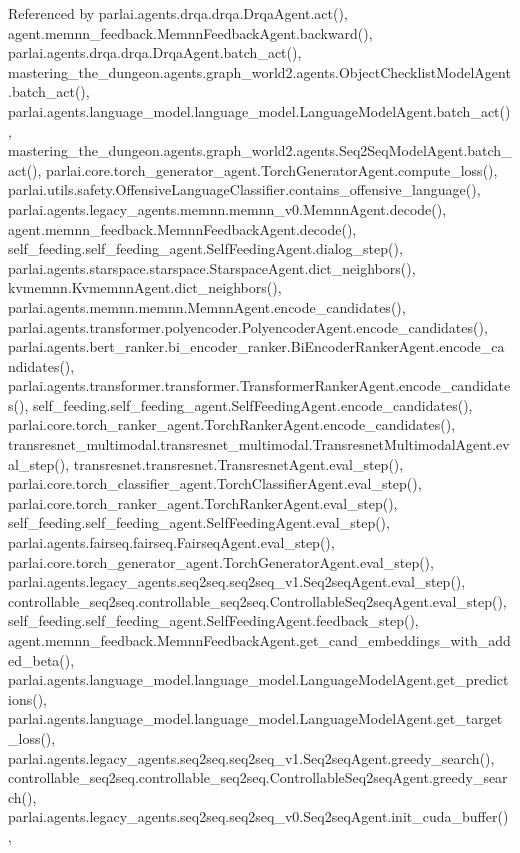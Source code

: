Referenced by parlai.\+agents.\+drqa.\+drqa.\+Drqa\+Agent.\+act(), agent.\+memnn\+\_\+feedback.\+Memnn\+Feedback\+Agent.\+backward(), parlai.\+agents.\+drqa.\+drqa.\+Drqa\+Agent.\+batch\+\_\+act(), mastering\+\_\+the\+\_\+dungeon.\+agents.\+graph\+\_\+world2.\+agents.\+Object\+Checklist\+Model\+Agent.\+batch\+\_\+act(), parlai.\+agents.\+language\+\_\+model.\+language\+\_\+model.\+Language\+Model\+Agent.\+batch\+\_\+act(), mastering\+\_\+the\+\_\+dungeon.\+agents.\+graph\+\_\+world2.\+agents.\+Seq2\+Seq\+Model\+Agent.\+batch\+\_\+act(), parlai.\+core.\+torch\+\_\+generator\+\_\+agent.\+Torch\+Generator\+Agent.\+compute\+\_\+loss(), parlai.\+utils.\+safety.\+Offensive\+Language\+Classifier.\+contains\+\_\+offensive\+\_\+language(), parlai.\+agents.\+legacy\+\_\+agents.\+memnn.\+memnn\+\_\+v0.\+Memnn\+Agent.\+decode(), agent.\+memnn\+\_\+feedback.\+Memnn\+Feedback\+Agent.\+decode(), self\+\_\+feeding.\+self\+\_\+feeding\+\_\+agent.\+Self\+Feeding\+Agent.\+dialog\+\_\+step(), parlai.\+agents.\+starspace.\+starspace.\+Starspace\+Agent.\+dict\+\_\+neighbors(), kvmemnn.\+Kvmemnn\+Agent.\+dict\+\_\+neighbors(), parlai.\+agents.\+memnn.\+memnn.\+Memnn\+Agent.\+encode\+\_\+candidates(), parlai.\+agents.\+transformer.\+polyencoder.\+Polyencoder\+Agent.\+encode\+\_\+candidates(), parlai.\+agents.\+bert\+\_\+ranker.\+bi\+\_\+encoder\+\_\+ranker.\+Bi\+Encoder\+Ranker\+Agent.\+encode\+\_\+candidates(), parlai.\+agents.\+transformer.\+transformer.\+Transformer\+Ranker\+Agent.\+encode\+\_\+candidates(), self\+\_\+feeding.\+self\+\_\+feeding\+\_\+agent.\+Self\+Feeding\+Agent.\+encode\+\_\+candidates(), parlai.\+core.\+torch\+\_\+ranker\+\_\+agent.\+Torch\+Ranker\+Agent.\+encode\+\_\+candidates(), transresnet\+\_\+multimodal.\+transresnet\+\_\+multimodal.\+Transresnet\+Multimodal\+Agent.\+eval\+\_\+step(), transresnet.\+transresnet.\+Transresnet\+Agent.\+eval\+\_\+step(), parlai.\+core.\+torch\+\_\+classifier\+\_\+agent.\+Torch\+Classifier\+Agent.\+eval\+\_\+step(), parlai.\+core.\+torch\+\_\+ranker\+\_\+agent.\+Torch\+Ranker\+Agent.\+eval\+\_\+step(), self\+\_\+feeding.\+self\+\_\+feeding\+\_\+agent.\+Self\+Feeding\+Agent.\+eval\+\_\+step(), parlai.\+agents.\+fairseq.\+fairseq.\+Fairseq\+Agent.\+eval\+\_\+step(), parlai.\+core.\+torch\+\_\+generator\+\_\+agent.\+Torch\+Generator\+Agent.\+eval\+\_\+step(), parlai.\+agents.\+legacy\+\_\+agents.\+seq2seq.\+seq2seq\+\_\+v1.\+Seq2seq\+Agent.\+eval\+\_\+step(), controllable\+\_\+seq2seq.\+controllable\+\_\+seq2seq.\+Controllable\+Seq2seq\+Agent.\+eval\+\_\+step(), self\+\_\+feeding.\+self\+\_\+feeding\+\_\+agent.\+Self\+Feeding\+Agent.\+feedback\+\_\+step(), agent.\+memnn\+\_\+feedback.\+Memnn\+Feedback\+Agent.\+get\+\_\+cand\+\_\+embeddings\+\_\+with\+\_\+added\+\_\+beta(), parlai.\+agents.\+language\+\_\+model.\+language\+\_\+model.\+Language\+Model\+Agent.\+get\+\_\+predictions(), parlai.\+agents.\+language\+\_\+model.\+language\+\_\+model.\+Language\+Model\+Agent.\+get\+\_\+target\+\_\+loss(), parlai.\+agents.\+legacy\+\_\+agents.\+seq2seq.\+seq2seq\+\_\+v1.\+Seq2seq\+Agent.\+greedy\+\_\+search(), controllable\+\_\+seq2seq.\+controllable\+\_\+seq2seq.\+Controllable\+Seq2seq\+Agent.\+greedy\+\_\+search(), parlai.\+agents.\+legacy\+\_\+agents.\+seq2seq.\+seq2seq\+\_\+v0.\+Seq2seq\+Agent.\+init\+\_\+cuda\+\_\+buffer(), 
